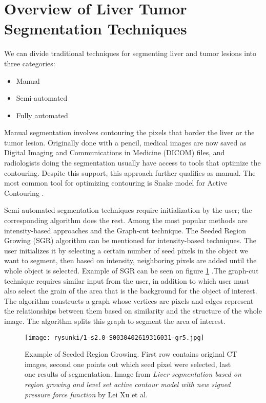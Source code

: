 \section{Overview of Liver Tumor Segmentation Techniques} \label{overview_techniques}


We can divide traditional techniques for segmenting liver and tumor lesions into three categories:
\begin{itemize}
    \item Manual 
    \item Semi-automated
    \item Fully automated     
\end{itemize}

Manual segmentation involves contouring the pixels that border the liver or the tumor lesion. Originally done with a pencil, medical images are now saved as Digital Imaging and Communications in Medicine (DICOM) files, and radiologists doing the segmentation usually have access to tools that optimize the contouring. Despite this support, this approach further qualifies as manual. The most common tool for optimizing contouring is Snake model for Active Contouring \cite{kass_snakes_1988}. 

Semi-automated segmentation techniques require initialization by the user; the corresponding algorithm does the rest. Among the most popular methods are intensity-based approaches and the Graph-cut technique. The Seeded Region Growing (SGR)  \cite{fan_seeded_2005} algorithm can be mentioned for intensity-based techniques. The user initializes it by selecting a certain number of seed pixels in the object we want to segment, then based on intensity, neighboring pixels are added until the whole object is selected. Example of SGR can be seen on figure \ref{rys:sgr} .The graph-cut technique \cite{boykov_graph_2006} requires similar input from the user, in addition to which user must also select the grain of the area that is the background for the object of interest. The algorithm constructs a graph whose vertices are pixels and edges represent the relationships between them based on similarity and the structure of the whole image. The algorithm splits this graph to segment the area of interest.

\begin{figure}[!h]
	\centering \texttt{[image: rysunki/1-s2.0-S0030402619316031-gr5.jpg]}
	\caption{Example of Seeded Region Growing. First row contains original CT images, second one points out which seed pixel were selected, last one results of segmentation. Image from  \textit{Liver segmentation based on region growing and level set active contour model with new signed pressure force function} by Lei Xu et al. }
	\label{rys:sgr}
\end{figure}


